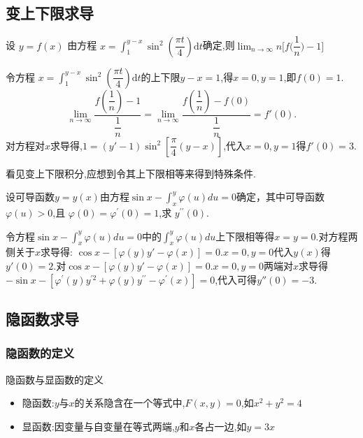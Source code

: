 \documentclass[8pt a4paper, oneside, UTF8]{ctexbook}  %
\begin{document}
\begin{sloppypar}
    \subsection{变上下限求导}
    \begin{problem}
        设 $y=f(x)$ 由方程 $x=\int_1^{y-x}\sin^2\left(\dfrac{\pi t}4\right)\mathrm{d}t$确定,则$\lim_{n\to\infty}n\bigg[f\bigg(\dfrac1n\bigg)-1\bigg]$
    \end{problem}
    \begin{solution}
       令方程 $x=\int_1^{y-x}\sin^2\left(\dfrac{\pi t}4\right)\mathrm{d}t$的上下限$y-x=1$,得$x=0,y=1$,即$f(0)=1$.
       $$\lim_{n\to \infty}\dfrac{f(\dfrac{1}{n})-1}{\dfrac{1}{n}}=\lim_{n\to \infty}\dfrac{f(\dfrac{1}{n})-f(0)}{\dfrac{1}{n}}=f'(0).$$
       对方程对$x$求导得,$1=(y'-1) \sin^2 [\dfrac{\pi}{4}(y-x)]$,代入$x=0,y=1$得$f'(0)=3.$
    \end{solution}
    \begin{note}
        看见变上下限积分,应想到令其上下限相等来得到特殊条件.
    \end{note}
    \begin{problem}
        设可导函数$y=y(x)$由方程$\sin x- \int _x^y\varphi ( u) du= 0$确定，其中可导函数$\varphi(u)>0$,且 $\varphi(0)=\varphi^\prime(0)=1$,求 $y^{\prime\prime}(0).$        
    \end{problem}
    \begin{solution}
        令方程$\sin x- \int _x^y\varphi (u) du= 0$中的$\int_x^y \varphi(u)du $上下限相等得$x=y=0$.对方程两侧关于$x$求导得: $\cos x-[\varphi(y)y'-\varphi(x)]=0$.$x=0,y=0$代入$y(x)$得$y'(0)=2$.对$\cos x-[\varphi(y)y'-\varphi(x)]=0$.$x=0,y=0$两端对$x$求导得$-\sin x-\left[\varphi^{\prime}(y)y^{\prime2}+\varphi(y)y^{\prime\prime}-\varphi^{\prime}(x)\right]=0 $,代入可得$y''(0)=-3$.
    \end{solution}
    \subsection{隐函数求导}
    \subsubsection{隐函数的定义}
    \begin{defn}{隐函数与显函数的定义}{}
    \begin{itemize}
        \item 隐函数:$y$与$x$的关系隐含在一个等式中,$F(x,y)=0$,如$x^2+y^2=4$
        \item  显函数:因变量与自变量在等式两端,$y$和$x$各占一边,如$y=3x$​
    \end{itemize}
    \end{defn}

\end{sloppypar}
\end{document}
